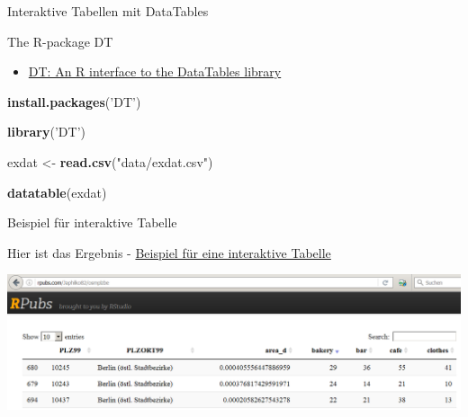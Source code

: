 \documentclass[ignorenonframetext,]{beamer}
\newenvironment{Shaded}{}{}
\newcommand{\KeywordTok}[1]{\textcolor[rgb]{0.00,0.44,0.13}{\textbf{{#1}}}}
\newcommand{\StringTok}[1]{\textcolor[rgb]{0.25,0.44,0.63}{{#1}}}
\newcommand{\NormalTok}[1]{{#1}}
\providecommand{\tightlist}{%
\setlength{\itemsep}{0pt}\setlength{\parskip}{0pt}}
\begin{document}
\begin{frame}[fragile]{Interaktive Tabellen mit DataTables}

\begin{block}{The R-package DT}

\begin{itemize}
\tightlist
\item
  \href{https://rstudio.github.io/DT/}{DT: An R interface to the
  DataTables library}
\end{itemize}

\begin{Shaded}
\begin{Highlighting}[]
\KeywordTok{install.packages}\NormalTok{(}\StringTok{'DT'}\NormalTok{)}
\end{Highlighting}
\end{Shaded}

\begin{Shaded}
\begin{Highlighting}[]
\KeywordTok{library}\NormalTok{(}\StringTok{'DT'}\NormalTok{)}
\end{Highlighting}
\end{Shaded}

\begin{Shaded}
\begin{Highlighting}[]
\NormalTok{exdat <-}\StringTok{ }\KeywordTok{read.csv}\NormalTok{(}\StringTok{"data/exdat.csv"}\NormalTok{)}
\end{Highlighting}
\end{Shaded}

\begin{Shaded}
\begin{Highlighting}[]
\KeywordTok{datatable}\NormalTok{(exdat)}
\end{Highlighting}
\end{Shaded}

\end{block}

\begin{block}{Beispiel für interaktive Tabelle}

Hier ist das Ergebnis -
\href{http://rpubs.com/Japhilko82/osmplzbe}{Beispiel für eine
interaktive Tabelle}

\includegraphics{./tex2pdf.9796/b7341e8913c14104084c904e440712bccda8197d.png}


\end{block}
\end{frame}
\end{document}
